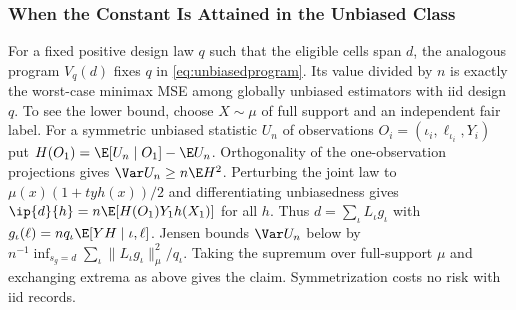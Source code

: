 \subsubsection{When the Constant Is Attained in the Unbiased Class}
For a fixed positive design law $q$ such that the eligible cells span $d$, the analogous program $V_q(d)$ fixes $q$ in \eqref{eq:unbiasedprogram}. Its value divided by $n$ is exactly the worst-case minimax MSE among globally unbiased estimators with iid design $q$. To see the lower bound, choose $X\sim\mu$ of full support and an independent fair label. For a symmetric unbiased statistic $U_n$ of observations $O_i=(\iota_i,\ell_{\iota_i},Y_i)$ put $H(O_1)=\E[U_n\mid O_1]-\E U_n$. Orthogonality of the one-observation projections gives $\Var U_n\ge n\E H^2$. Perturbing the joint law to $\mu(x)(1+t y h(x))/2$ and differentiating unbiasedness gives $\ip{d}{h}=n\E[H(O_1)Y_1h(X_1)]$ for all $h$. Thus $d=\sum_\iota L_\iota g_\iota$ with $g_\iota(\ell)=nq_\iota\E[YH\mid \iota,\ell]$. Jensen bounds $\Var U_n$ below by $n^{-1}\inf_{s_g=d}\sum_\iota\|L_\iota g_\iota\|_\mu^2/q_\iota$. Taking the supremum over full-support $\mu$ and exchanging extrema as above gives the claim. Symmetrization costs no risk with iid records.


